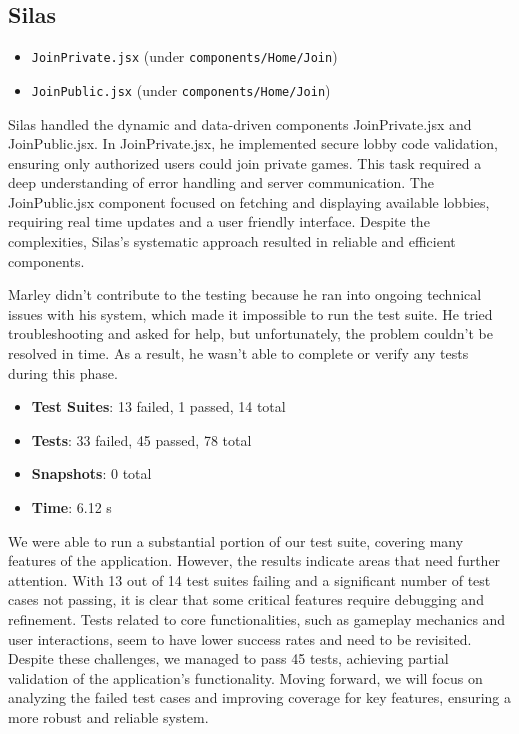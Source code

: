 \subsection*{Silas}
\begin{itemize}
    \item \texttt{JoinPrivate.jsx} (under \texttt{components/Home/Join})
    \item \texttt{JoinPublic.jsx} (under \texttt{components/Home/Join})
\end{itemize}

\noindent Silas handled the dynamic and data-driven components JoinPrivate.jsx and JoinPublic.jsx. In JoinPrivate.jsx, he implemented secure lobby code validation, ensuring only authorized users could join private games. This task required a deep understanding of error handling and server communication. The JoinPublic.jsx component focused on fetching and displaying available lobbies, requiring real time updates and a user friendly interface. Despite the complexities, Silas’s systematic approach resulted in reliable and efficient components.

\noindent Marley didn’t contribute to the testing because he ran into ongoing technical issues with his system, which made it impossible to run the test suite. He tried troubleshooting and asked for help, but unfortunately, the problem couldn’t be resolved in time. As a result, he wasn’t able to complete or verify any tests during this phase.


\begin{itemize}
    \item \textbf{Test Suites}: 13 failed, 1 passed, 14 total
    \item \textbf{Tests}: 33 failed, 45 passed, 78 total
    \item \textbf{Snapshots}: 0 total
    \item \textbf{Time}: 6.12 s
\end{itemize}

\noindent We were able to run a substantial portion of our test suite, covering many features of the application. However, the results indicate areas that need further attention. With 13 out of 14 test suites failing and a significant number of test cases not passing, it is clear that some critical features require debugging and refinement. Tests related to core functionalities, such as gameplay mechanics and user interactions, seem to have lower success rates and need to be revisited. Despite these challenges, we managed to pass 45 tests, achieving partial validation of the application’s functionality. Moving forward, we will focus on analyzing the failed test cases and improving coverage for key features, ensuring a more robust and reliable system.